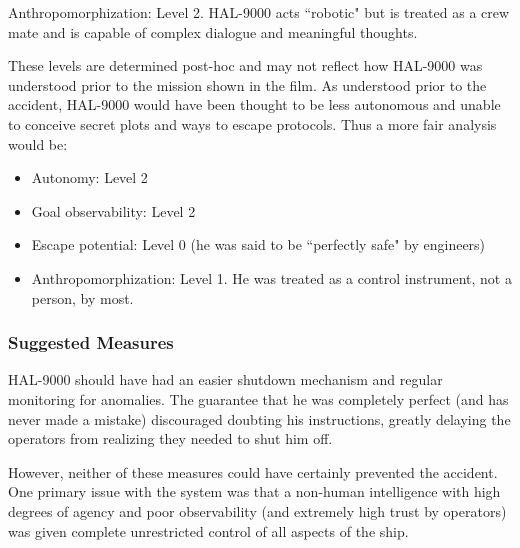\documentclass[11pt]{article}
\begin{document}
Anthropomorphization: Level 2. HAL-9000 acts ``robotic" but is treated as a crew mate and is capable
of complex dialogue and meaningful thoughts.

These levels are determined post-hoc and may not reflect how HAL-9000 was understood prior to the
mission shown in the film. As understood prior to the accident, HAL-9000 would have been thought to
be less autonomous and unable to conceive secret plots and ways to escape protocols. Thus a more
fair analysis would be:

\begin{itemize}
\item Autonomy: Level 2
\item Goal observability: Level 2
\item Escape potential: Level 0 (he was said to be ``perfectly safe" by engineers)
\item Anthropomorphization: Level 1. He was treated as a control instrument, not a person, by most.
\end{itemize}


\subsubsection{Suggested Measures}

HAL-9000 should have had an easier shutdown mechanism and regular monitoring for anomalies. The
guarantee that he was completely perfect (and has never made a mistake) discouraged doubting his
instructions, greatly delaying the operators from realizing they needed to shut him off. 

However, neither of these measures could have certainly prevented the accident. One primary issue
with the system was that a non-human intelligence with high degrees of agency and poor observability
(and extremely high trust by operators) was given complete unrestricted control of all aspects of
the ship.

\newpage
{}

\end{document}
